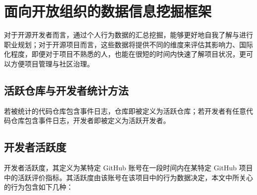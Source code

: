 \section{面向开放组织的数据信息挖掘框架}

\par 对于开源开发者而言，通过个人行为数据的汇总挖掘，能够更好地自我了解与进行职业规划；对于开源项目而言，这些数据将提供不同的维度来评估其影响力、国际化程度，即便对于项目不熟悉的人，也能在很短的时间内快速了解项目状况，更可以方便项目管理与社区治理\cite{kalliamvakou2014promises}。


\subsection{活跃仓库与开发者统计方法}
\par 若被统计的代码仓库包含事件日志，仓库即被定义为活跃仓库；若开发者有任意代码仓库包含事件日志，开发者即被定义为活跃开发者。

\subsection{开发者活跃度}
\par 开发者活跃度，其定义为某特定 GitHub 账号在一段时间内在某特定 GitHub 项目中的活跃评价指标。其活跃度由该账号在该项目中的行为数据决定，本文中所关心的行为包含如下几种：\cite{王伟2020全球开源生态发展现状研究}


